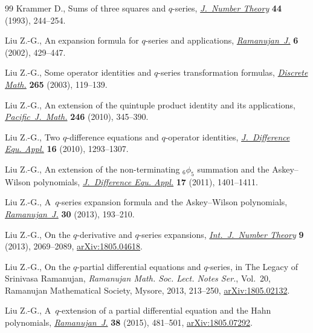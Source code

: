 \begin{thebibliography}{99}
Krammer D., Sums of three squares and {$q$}-series, \href{https://doi.org/10.1006/jnth.1993.1050}{\textit{J.~Number Theory}}
 \textbf{44} (1993), 244--254.

Liu Z.-G., An expansion formula for {$q$}-series and applications,
 \href{https://doi.org/10.1023/A:1021306016666}{\textit{Ramanujan~J.}} \textbf{6} (2002), 429--447.

Liu Z.-G., Some operator identities and {$q$}-series transformation formulas,
 \href{https://doi.org/10.1016/S0012-365X(02)00626-X}{\textit{Discrete Math.}} \textbf{265} (2003), 119--139.

Liu Z.-G., An extension of the quintuple product identity and its applications,
 \href{https://doi.org/10.2140/pjm.2010.246.345}{\textit{Pacific~J.~Math.}} \textbf{246} (2010), 345--390.

Liu Z.-G., Two {$q$}-difference equations and {$q$}-operator identities,
 \href{https://doi.org/10.1080/10236190902810385}{\textit{J.~Difference Equ. Appl.}} \textbf{16} (2010), 1293--1307.

Liu Z.-G., An extension of the non-terminating {${}_6\phi_5$} summation and the
 {A}skey--{W}ilson polynomials, \href{https://doi.org/10.1080/10236190903530735}{\textit{J.~Difference Equ. Appl.}} \textbf{17}
 (2011), 1401--1411.

Liu Z.-G., A~{$q$}-series expansion formula and the {A}skey--{W}ilson
 polynomials, \href{https://doi.org/10.1007/s11139-012-9450-2}{\textit{Ramanujan~J.}} \textbf{30} (2013), 193--210.

Liu Z.-G., On the {$q$}-derivative and {$q$}-series expansions,
 \href{https://doi.org/10.1142/S1793042113500759}{\textit{Int.~J.~Number Theory}} \textbf{9} (2013), 2069--2089,
 \href{https://arxiv.org/abs/1805.04618}{arXiv:1805.04618}.

Liu Z.-G., On the {$q$}-partial differential equations and {$q$}-series, in The
 Legacy of {S}rinivasa {R}amanujan, \textit{Ramanujan Math. Soc. Lect. Notes
 Ser.}, Vol.~20, Ramanujan Mathematical Society, Mysore, 2013, 213--250,
 \href{https://arxiv.org/abs/1805.02132}{arXiv:1805.02132}.

Liu Z.-G., A~{$q$}-extension of a partial differential equation and the {H}ahn
 polynomials, \href{https://doi.org/10.1007/s11139-014-9632-1}{\textit{Ramanujan~J.}} \textbf{38} (2015), 481--501,
 \href{https://arxiv.org/abs/1805.07292}{arXiv:1805.07292}.


\end{thebibliography}
